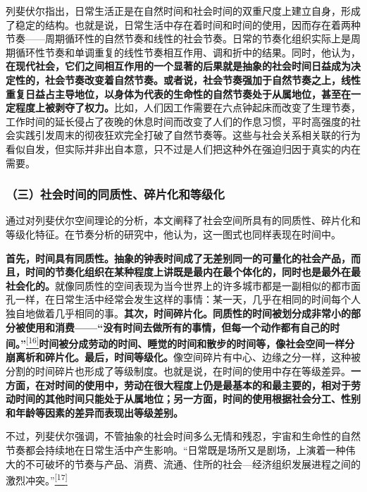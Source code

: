 \documentclass[UTF8, fontset = sourcesans, a4paper, oneside, zihao =
-4, scheme=chinese, no-math, space=true]{ctexbook}
\begin{document}
列斐伏尔指出，日常生活正是在自然时间和社会时间的双重尺度上建立自身，形成了稳定的结构。也就是说，日常生活中存在着时间和时间的使用，因而存在着两种节奏------周期循环性的自然节奏和线性的社会节奏。日常的节奏化组织实际上是周期循环性节奏和单调重复的线性节奏相互作用、调和折中的结果。同时，他认为，\textbf{在现代社会，它们之间相互作用的一个显著的后果就是抽象的社会时间日益成为决定性的，社会节奏改变着自然节奏。或者说，社会节奏强加于自然节奏之上，线性重复日益占主导地位，以身体为代表的生命性的自然节奏处于从属地位，甚至在一定程度上被剥夺了权力。}比如，人们因工作需要在六点钟起床而改变了生理节奏，工作时间的延长侵占了夜晚的休息时间而改变了人们的作息习惯，平时高强度的社会实践引发周末的彻夜狂欢完全打破了自然节奏等。这些与社会关系相关联的行为看似自发，但实际并非出自本意，只不过是人们把这种外在强迫归因于真实的内在需要。

\subsubsection{（三）社会时间的同质性、碎片化和等级化}\label{part0009_split_002.htmlux5cux23d032}

通过对列斐伏尔空间理论的分析，本文阐释了社会空间所具有的同质性、碎片化和等级化特征。在节奏分析的研究中，他认为，这一图式也同样表现在时间中。

\textbf{首先，时间具有同质性。抽象的钟表时间成了无差别同一的可量化的社会产品，而且，时间的节奏化组织在某种程度上讲既是最内在最个体化的，同时也是最外在最社会化的。}就像同质性的空间表现为当今世界上的许多城市都是一副相似的都市面孔一样，在日常生活中经常会发生这样的事情：某一天，几乎在相同的时间每个人独自地做着几乎相同的事。\textbf{其次，时间碎片化。同质性的时间被划分成非常小的部分被使用和消费------``没有时间去做所有的事情，但每一个动作都有自己的时间。''}\protect\hypertarget{part0009_split_002.htmlux5cux23w16}{}{}\protect\hyperlink{part0009_split_004.htmlux5cux23m16}{\textsuperscript{{[}16{]}}}\textbf{时间被分成劳动的时间、睡觉的时间和散步的时间等，像社会空间一样分崩离析和碎片化。最后，时间等级化。}像空间碎片有中心、边缘之分一样，这种被分割的时间碎片也形成了等级制度。也就是说，在时间的使用中存在等级差异。\textbf{一方面，在对时间的使用中，劳动在很大程度上仍是最基本的和最主要的，相对于劳动时间的其他时间只能处于从属地位；另一方面，时间的使用根据社会分工、性别和年龄等因素的差异而表现出等级差别。}

不过，列斐伏尔强调，不管抽象的社会时间多么无情和残忍，宇宙和生命性的自然节奏都会持续地在日常生活中产生影响。``日常既是场所又是剧场，上演着一种伟大的不可破坏的节奏与产品、消费、流通、住所的社会---经济组织发展进程之间的激烈冲突。''\protect\hypertarget{part0009_split_002.htmlux5cux23w17}{}{}\protect\hyperlink{part0009_split_004.htmlux5cux23m17}{\textsuperscript{{[}17{]}}}
\end{document}
